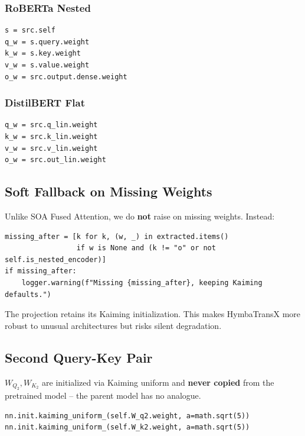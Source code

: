 \subsubsection{RoBERTa Nested}

\begin{lstlisting}
s = src.self
q_w = s.query.weight
k_w = s.key.weight
v_w = s.value.weight
o_w = src.output.dense.weight
\end{lstlisting}

\subsubsection{DistilBERT Flat}

\begin{lstlisting}
q_w = src.q_lin.weight
k_w = src.k_lin.weight
v_w = src.v_lin.weight
o_w = src.out_lin.weight
\end{lstlisting}

\subsection{Soft Fallback on Missing Weights}

Unlike SOA Fused Attention, we do \textbf{not} raise on missing weights. Instead:

\begin{lstlisting}
missing_after = [k for k, (w, _) in extracted.items() 
                 if w is None and (k != "o" or not self.is_nested_encoder)]
if missing_after:
    logger.warning(f"Missing {missing_after}, keeping Kaiming defaults.")
\end{lstlisting}

The projection retains its Kaiming initialization. This makes HymbaTransX 
more robust to unusual architectures but risks silent degradation.

\subsection{Second Query-Key Pair}

$W_{Q_2}, W_{K_2}$ are initialized via Kaiming uniform and \textbf{never copied} 
from the pretrained model -- the parent model has no analogue.

\begin{lstlisting}
nn.init.kaiming_uniform_(self.W_q2.weight, a=math.sqrt(5))
nn.init.kaiming_uniform_(self.W_k2.weight, a=math.sqrt(5))
\end{lstlisting}

